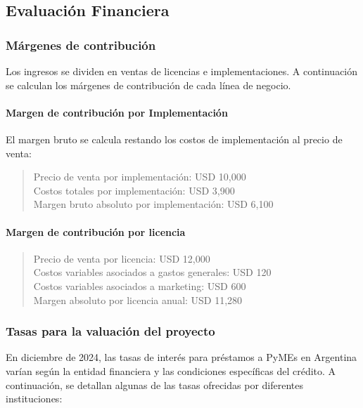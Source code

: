 \subsection{Evaluación Financiera}

\subsubsection{Márgenes de contribución}

Los ingresos se dividen en ventas de licencias e implementaciones. A continuación se calculan los márgenes de contribución de cada línea de negocio.

\paragraph{Margen de contribución por Implementación}

El margen bruto se calcula restando los costos de implementación al precio de venta:

\begin{quote}
Precio de venta por implementación: USD 10,000\\
Costos totales por implementación: USD 3,900\\
Margen bruto absoluto por implementación: USD 6,100
\end{quote}
	
\paragraph{Margen de contribución por licencia}

\begin{quote}
Precio de venta por licencia: USD 12,000\\
Costos variables asociados a gastos generales: USD 120\\
Costos variables asociados a marketing: USD 600\\
Margen absoluto por licencia anual: USD 11,280
\end{quote}

\subsubsection{Tasas para la valuación del proyecto}

En diciembre de 2024, las tasas de interés para préstamos a PyMEs en Argentina varían según la entidad financiera y las condiciones específicas del crédito. A continuación, se detallan algunas de las tasas ofrecidas por diferentes instituciones:

